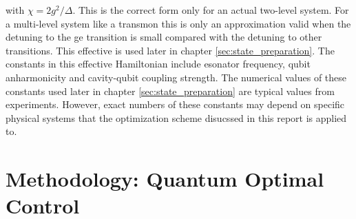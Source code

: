 \documentclass[12pt]{report}
\begin{document}
with $\chi=2 g^2 / \Delta$. This is the correct form only for an actual two-level system. 
For a multi-level system like a transmon this is only an approximation valid when the detuning to the ge transition is small compared with the detuning to other transitions.
This effective is used later in chapter \ref{sec:state_preparation}. 
The constants in this effective Hamiltonian include esonator frequency, qubit anharmonicity and cavity-qubit coupling strength. 
The numerical values of these constants used later in chapter \ref{sec:state_preparation} are typical values from experiments. 
However, exact numbers of these constants may depend on specific physical systems that the optimization scheme disucssed in this report is applied to. 

\chapter{Methodology: Quantum Optimal Control}\label{sec:methodology}
\end{document}
